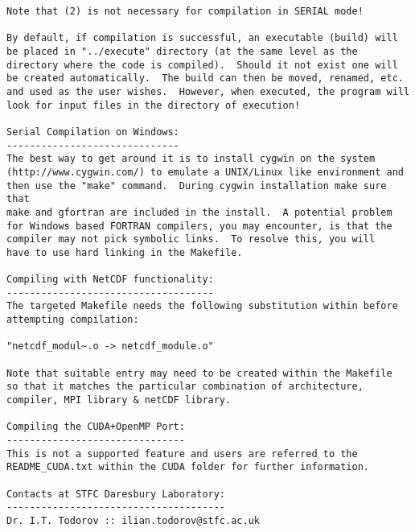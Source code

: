 \begin{verbatim}
Note that (2) is not necessary for compilation in SERIAL mode!

By default, if compilation is successful, an executable (build) will
be placed in "../execute" directory (at the same level as the
directory where the code is compiled).  Should it not exist one will
be created automatically.  The build can then be moved, renamed, etc.
and used as the user wishes.  However, when executed, the program will
look for input files in the directory of execution!

Serial Compilation on Windows:
------------------------------
The best way to get around it is to install cygwin on the system
(http://www.cygwin.com/) to emulate a UNIX/Linux like environment and
then use the "make" command.  During cygwin installation make sure that
make and gfortran are included in the install.  A potential problem
for Windows based FORTRAN compilers, you may encounter, is that the
compiler may not pick symbolic links.  To resolve this, you will
have to use hard linking in the Makefile.

Compiling with NetCDF functionality:
------------------------------------
The targeted Makefile needs the following substitution within before
attempting compilation:

"netcdf_modul~.o -> netcdf_module.o"

Note that suitable entry may need to be created within the Makefile
so that it matches the particular combination of architecture,
compiler, MPI library & netCDF library.

Compiling the CUDA+OpenMP Port:
-------------------------------
This is not a supported feature and users are referred to the
README_CUDA.txt within the CUDA folder for further information.

Contacts at STFC Daresbury Laboratory:
--------------------------------------
Dr. I.T. Todorov :: ilian.todorov@stfc.ac.uk
\end{verbatim}
